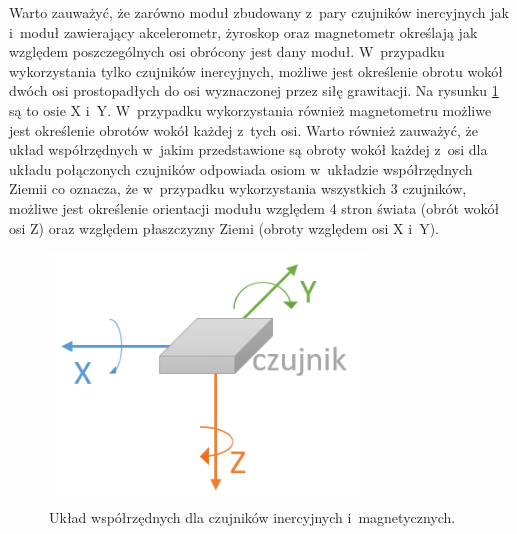 Warto zauważyć, że zarówno moduł zbudowany z~pary czujników inercyjnych jak i~moduł zawierający akcelerometr, żyroskop oraz magnetometr określają jak względem poszczególnych osi obrócony jest dany moduł. W~przypadku wykorzystania tylko czujników inercyjnych, możliwe jest określenie obrotu wokół dwóch osi prostopadłych do osi wyznaczonej przez siłę grawitacji. Na rysunku \ref{fig:literature:imu:coordination} są to osie X i~Y. W~przypadku wykorzystania również magnetometru możliwe jest określenie obrotów wokół każdej z~tych osi. Warto również zauważyć, że układ współrzędnych w~jakim przedstawione są obroty wokół każdej z~osi dla układu połączonych czujników odpowiada osiom w~układzie współrzędnych Ziemii co oznacza, że w~przypadku wykorzystania wszystkich 3 czujników, możliwe jest określenie orientacji modułu względem 4 stron świata (obrót wokół osi Z) oraz względem płaszczyzny Ziemi (obroty względem osi X i~Y).

\begin{figure}[!htp]
	\centering	
	\includegraphics[width=0.75\textwidth]{images/IMUAxes.png}
	\caption{Układ współrzędnych dla czujników inercyjnych i~magnetycznych.}
	\label{fig:literature:imu:coordination}
\end{figure}

